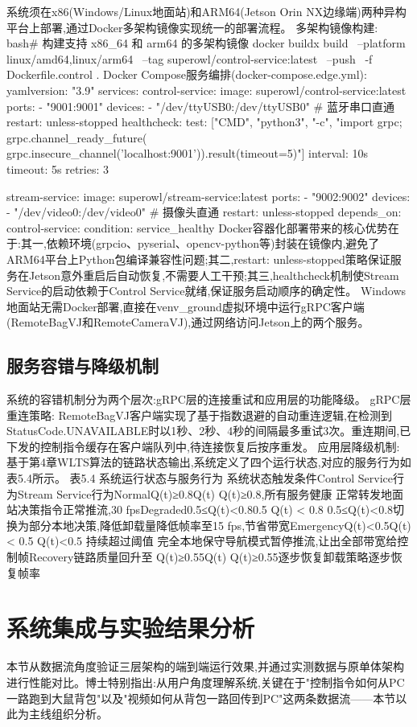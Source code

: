 系统须在x86(Windows/Linux地面站)和ARM64(Jetson Orin NX边缘端)两种异构平台上部署,通过Docker多架构镜像实现统一的部署流程。
多架构镜像构建:
bash# 构建支持 x86_64 和 arm64 的多架构镜像
docker buildx build \
  --platform linux/amd64,linux/arm64 \
  --tag superowl/control-service:latest \
  --push \
  -f Dockerfile.control .
Docker Compose服务编排(docker-compose.edge.yml):
yamlversion: "3.9"
services:
  control-service:
    image: superowl/control-service:latest
    ports:
      - "9001:9001"
    devices:
      - "/dev/ttyUSB0:/dev/ttyUSB0"  # 蓝牙串口直通
    restart: unless-stopped
    healthcheck:
      test: ["CMD", "python3", "-c",
             "import grpc; grpc.channel_ready_future(
              grpc.insecure_channel('localhost:9001')).result(timeout=5)"]
      interval: 10s
      timeout: 5s
      retries: 3

  stream-service:
    image: superowl/stream-service:latest
    ports:
      - "9002:9002"
    devices:
      - "/dev/video0:/dev/video0"    # 摄像头直通
    restart: unless-stopped
    depends_on:
      control-service:
        condition: service_healthy
Docker容器化部署带来的核心优势在于:其一,依赖环境(grpcio、pyserial、opencv-python等)封装在镜像内,避免了ARM64平台上Python包编译兼容性问题;其二,restart: unless-stopped策略保证服务在Jetson意外重启后自动恢复,不需要人工干预;其三,healthcheck机制使Stream Service的启动依赖于Control Service就绪,保证服务启动顺序的确定性。
Windows地面站无需Docker部署,直接在venv_ground虚拟环境中运行gRPC客户端(RemoteBagVJ和RemoteCameraVJ),通过网络访问Jetson上的两个服务。
\subsection{服务容错与降级机制}
系统的容错机制分为两个层次:gRPC层的连接重试和应用层的功能降级。
gRPC层重连策略: RemoteBagVJ客户端实现了基于指数退避的自动重连逻辑,在检测到StatusCode.UNAVAILABLE时以1秒、2秒、4秒的间隔最多重试3次。重连期间,已下发的控制指令缓存在客户端队列中,待连接恢复后按序重发。
应用层降级机制: 基于第4章WLTS算法的链路状态输出,系统定义了四个运行状态,对应的服务行为如表5.4所示。
表5.4 系统运行状态与服务行为
系统状态触发条件Control Service行为Stream Service行为NormalQ(t)≥0.8Q(t) 
Q(t)≥0.8,所有服务健康
正常转发地面站决策指令正常推流,30 fpsDegraded0.5≤Q(t)<0.80.5 \leq Q(t) < 0.8
0.5≤Q(t)<0.8切换为部分本地决策,降低卸载量降低帧率至15 fps,节省带宽EmergencyQ(t)<0.5Q(t) < 0.5
Q(t)<0.5 持续超过阈值
完全本地保守导航模式暂停推流,让出全部带宽给控制帧Recovery链路质量回升至 Q(t)≥0.55Q(t) 
Q(t)≥0.55逐步恢复卸载策略逐步恢复帧率
\section{系统集成与实验结果分析}
本节从数据流角度验证三层架构的端到端运行效果,并通过实测数据与原单体架构进行性能对比。博士特别指出:从用户角度理解系统,关键在于"控制指令如何从PC一路跑到大鼠背包"以及"视频如何从背包一路回传到PC"这两条数据流——本节以此为主线组织分析。
